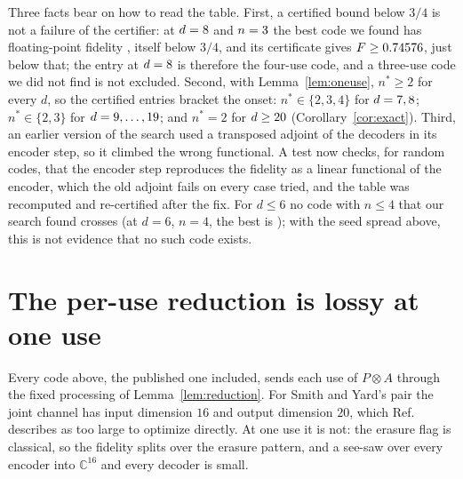 \documentclass[aps,pra,twocolumn,superscriptaddress,nofootinbib,longbibliography,floatfix]{revtex4-2}
\begin{document}
Three facts bear on how to read the table. First, a certified bound below $3/4$ is not a failure of the certifier: at $d=8$ and $n=3$ the best code we found has floating-point fidelity \DarkFloat, itself below $3/4$, and its certificate gives $F\ge0.74576$, just below that; the entry at $d=8$ is therefore the four-use code, and a three-use code we did not find is not excluded. Second, with Lemma~\ref{lem:oneuse}, $n^*\ge2$ for every $d$, so the certified entries bracket the onset: $n^*\in\{2,3,4\}$ for $d=7,8$; $n^*\in\{2,3\}$ for $d=9,\dots,19$; and $n^*=2$ for $d\ge20$ (Corollary~\ref{cor:exact}). Third, an earlier version of the search used a transposed adjoint of the decoders in its encoder step, so it climbed the wrong functional. A test now checks, for random codes, that the encoder step reproduces the fidelity as a linear functional of the encoder, which the old adjoint fails on every case tried, and the table was recomputed and re-certified after the fix. For $d\le6$ no code with $n\le4$ that our search found crosses (at $d=6$, $n=4$, the best is \SixFour); with the seed spread above, this is not evidence that no such code exists.

\section{The per-use reduction is lossy at one use}
\label{sec:direct}

Every code above, the published one included, sends each use of $P\otimes A$ through the fixed processing of Lemma~\ref{lem:reduction}. For Smith and Yard's pair the joint channel has input dimension $16$ and output dimension $20$, which Ref.~\cite{parentin2026onset} describes as too large to optimize directly. At one use it is not: the erasure flag is classical, so the fidelity splits over the erasure pattern, and a see-saw over every encoder into $\mathbb C^{16}$ and every decoder is small.
\end{document}
